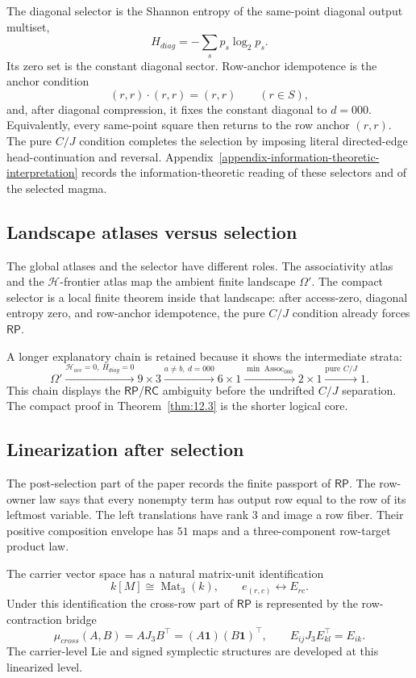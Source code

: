 \documentclass[11pt]{article}
\theoremstyle{definition}
\newcommand{\RP}{\mathsf{RP}}
\newcommand{\RC}{\mathsf{RC}}
\begin{document}
The diagonal selector is the Shannon entropy of the same-point diagonal
output multiset,
\[
H_{diag}=-\sum_s p_s\log_2 p_s.
\]
Its zero set is the constant diagonal sector.  Row-anchor idempotence is
the anchor condition
\[
(r,r)\cdot(r,r)=(r,r)\qquad(r\in S),
\]
and, after diagonal compression, it fixes the constant diagonal to
\(d=000\).  Equivalently, every same-point square then returns to the row
anchor \((r,r)\).  The pure \(C/J\) condition completes the selection by
imposing literal directed-edge head-continuation and reversal.
Appendix~\ref{appendix-information-theoretic-interpretation} records the
information-theoretic reading of these selectors and of the selected magma.

\subsection{Landscape atlases versus selection}\label{landscape-atlases-versus-selection}

The global atlases and the selector have different roles.  The associativity
atlas and the \(\mathcal H\)-frontier atlas map the ambient finite landscape
\(\Omega'\).  The compact selector is a local finite theorem inside that
landscape: after access-zero, diagonal entropy zero, and row-anchor
idempotence, the pure \(C/J\) condition already forces \(\RP\).

A longer explanatory chain is retained because it shows the intermediate
strata:
\[
\Omega'
\xrightarrow{\mathcal H_{acc}=0,
\ H_{diag}=0}
9\times3
\xrightarrow{a\ne b,
\ d=000}
6\times1
\xrightarrow{\min\operatorname{Assoc}_{000}}
2\times1
\xrightarrow{\text{pure }C/J}
1.
\]
This chain displays the \(\RP\)/\(\RC\) ambiguity before the undrifted
\(C/J\) separation.  The compact proof in Theorem~\ref{thm:12.3} is the
shorter logical core.

\subsection{Linearization after selection}\label{linearization-after-selection}

The post-selection part of the paper records the finite passport of
\(\RP\).  The row-owner law says that every nonempty term has output row
equal to the row of its leftmost variable.  The left translations have rank
\(3\) and image a row fiber.  Their positive composition envelope has
\(51\) maps and a three-component row-target product law.

The carrier vector space has a natural matrix-unit identification
\[
k[M]\cong\operatorname{Mat}_3(k),
\qquad e_{(r,c)}\leftrightarrow E_{rc}.
\]
Under this identification the cross-row part of \(\RP\) is represented by
the row-contraction bridge
\[
\mu_{cross}(A,B)=AJ_3B^\top=(A\mathbf1)(B\mathbf1)^\top,
\qquad
E_{ij}J_3E_{kl}^{\top}=E_{ik}.
\]
The carrier-level Lie and signed symplectic structures are developed at
this linearized level.
\end{document}
